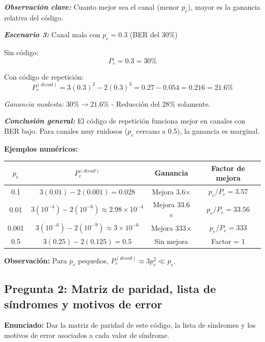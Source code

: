 \documentclass[11pt,a4paper]{article}
\begin{document}
\textit{\textbf{Observaci\'on clave:}} Cuanto mejor sea el canal (menor $p_e$), mayor es la ganancia relativa del c\'odigo.

\vspace{0.2cm}

\textit{\textbf{Escenario 3:}} Canal malo con $p_e = 0.3$ (BER del 30\%)

Sin c\'odigo:
\[
P_e = 0.3 = 30\%
\]

Con c\'odigo de repetici\'on:
\[
P_e^{(decod)} = 3(0.3)^2 - 2(0.3)^3 = 0.27 - 0.054 = 0.216 = 21.6\%
\]

\textit{Ganancia modesta:} $30\% \to 21.6\%$ - Reducci\'on del $28\%$ solamente.

\vspace{0.2cm}

\textit{\textbf{Conclusi\'on general:}} El c\'odigo de repetici\'on funciona mejor en canales con BER bajo. Para canales muy ruidosos ($p_e$ cercano a 0.5), la ganancia es marginal.

\textbf{Ejemplos num\'ericos:}

\begin{center}
\begin{tabular}{|c|c|c|c|}
\hline
\textbf{$p_e$} & \textbf{$P_e^{(decod)}$} & \textbf{Ganancia} & \textbf{Factor de mejora} \\
\hline
0.1 & $3(0.01) - 2(0.001) = 0.028$ & Mejora 3.6$\times$ & $p_e/P_e = 3.57$ \\
0.01 & $3(10^{-4}) - 2(10^{-6}) \approx 2.98 \times 10^{-4}$ & Mejora 33.6$\times$ & $p_e/P_e = 33.56$ \\
0.001 & $3(10^{-6}) - 2(10^{-9}) \approx 3 \times 10^{-6}$ & Mejora 333$\times$ & $p_e/P_e = 333$ \\
0.5 & $3(0.25) - 2(0.125) = 0.5$ & Sin mejora & Factor = 1 \\
\hline
\end{tabular}
\end{center}

\textbf{Observaci\'on:} Para $p_e$ peque\~nos, $P_e^{(decod)} \approx 3p_e^2 \ll p_e$.

\subsection*{Pregunta 2: Matriz de paridad, lista de s\'indromes y motivos de error}

\textbf{Enunciado:} Dar la matriz de paridad de este c\'odigo, la lista de s\'indromes y los motivos de error asociados a cada valor de s\'indrome.
\end{document}
